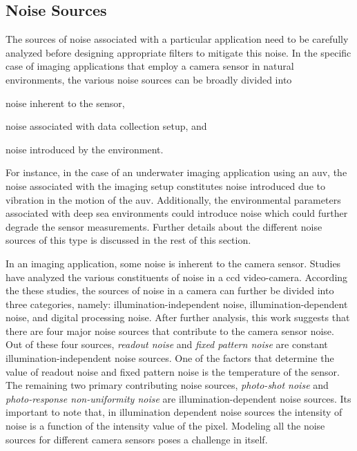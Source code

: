 \documentclass {udthesis}
\begin{document}
\subsection{Noise Sources}
\label{sec:noise_sources}

The sources of noise associated with a particular  application need to be carefully analyzed before designing appropriate filters to mitigate this noise.
In the specific case of imaging applications that employ a camera sensor in natural environments, the various noise sources can be broadly divided
into \begin{enumerate*}[label=(\roman*)] \item noise inherent to the sensor, \item noise associated with data collection setup, and \item noise introduced by the environment. \end{enumerate*} For instance, in the case of an underwater imaging application using an \gls{auv}, the noise associated with the imaging setup constitutes noise introduced due to vibration in the motion of the \gls{auv}. Additionally, the environmental parameters associated with deep sea environments could introduce noise which could further degrade the sensor measurements. Further details about the different noise sources of this type is discussed in the rest of this section.

In an imaging application, some noise is inherent to the camera sensor. Studies \cite{irie} have analyzed the various constituents of noise 
in a \gls{ccd} video-camera. According the these studies, the sources of noise in a camera can further be divided into three categories, namely: illumination-independent noise, illumination-dependent noise, and digital processing noise. After further analysis, this work suggests that there are four major noise sources that contribute to the camera sensor noise. Out of these four sources, \emph{readout noise} and \emph{fixed pattern noise} are constant illumination-independent noise sources. One of the factors that determine the value of readout noise and fixed pattern noise is the temperature of the sensor. The remaining two primary contributing noise sources, \emph{photo-shot noise} and \emph{photo-response non-uniformity noise} are illumination-dependent noise sources. Its important to note that, in illumination dependent noise sources the intensity of noise is a function of the intensity value of the pixel. Modeling all the noise sources for different camera sensors poses a challenge in itself.
\end{document}
